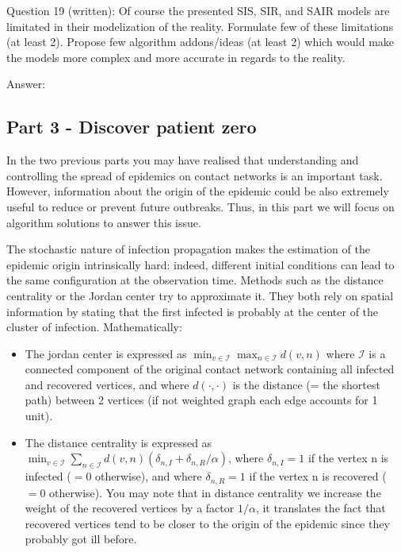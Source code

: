 \documentclass[11pt]{article}
\providecommand{\tightlist}{%
      \setlength{\itemsep}{0pt}\setlength{\parskip}{0pt}}
\begin{document}
    Question 19 (written): Of course the presented SIS, SIR, and SAIR models
are limitated in their modelization of the reality. Formulate few of
these limitations (at least 2). Propose few algorithm addons/ideas (at
least 2) which would make the models more complex and more accurate in
regards to the reality.

Answer:

    \subsection{Part 3 - Discover patient
zero}\label{part-3---discover-patient-zero}

In the two previous parts you may have realised that understanding and
controlling the spread of epidemics on contact networks is an important
task. However, information about the origin of the epidemic could be
also extremely useful to reduce or prevent future outbreaks. Thus, in
this part we will focus on algorithm solutions to answer this issue.

The stochastic nature of infection propagation makes the estimation of
the epidemic origin intrinsically hard: indeed, different initial
conditions can lead to the same configuration at the observation time.
Methods such as the distance centrality or the Jordan center try to
approximate it. They both rely on spatial information by stating that
the first infected is probably at the center of the cluster of
infection. Mathematically:

\begin{itemize}
\tightlist
\item
  The jordan center is expressed as
  \(\min_{v\in \mathcal{I}}\max_{n\in \mathcal{I}}d(v,n)\) where
  \(\mathcal{I}\) is a connected component of the original contact
  network containing all infected and recovered vertices, and where
  \(d(\cdot,\cdot)\) is the distance (= the shortest path) between 2
  vertices (if not weighted graph each edge accounts for 1 unit).
\item
  The distance centrality is expressed as
  \(\min_{v\in \mathcal{I}}\sum_{n\in \mathcal{I}}d(v,n)(\delta_{n,I} + \delta_{n,R}/\alpha)\),
  where \(\delta_{n,I}=1\) if the vertex n is infected (\(=0\)
  otherwise), and where \(\delta_{n,R}=1\) if the vertex n is recovered
  (\(=0\) otherwise). You may note that in distance centrality we
  increase the weight of the recovered vertices by a factor
  \(1/\alpha\), it translates the fact that recovered vertices tend to
  be closer to the origin of the epidemic since they probably got ill
  before.
\end{itemize}
\end{document}
